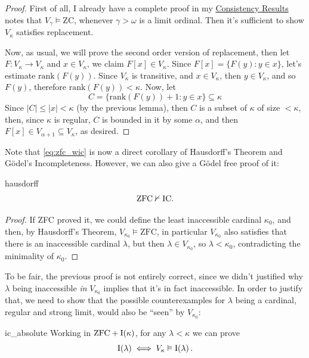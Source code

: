 \begin{proof}
    First of all, I already have a complete proof in my \href{https://github.com/Xennonio/Consistency-Results}{Consistency Results} notes that $V_\gamma\vDash\text{ZC}$, whenever $\gamma>\omega$ is a limit ordinal. Then it's sufficient to show $V_\kappa$ satisfies replacement.

    Now, as usual, we will prove the second order version of replacement, then let $F:V_\kappa\to V_\kappa$ and $x\in V_\kappa$, we claim $F[x]\in V_\kappa$. Since $F[x]=\{F(y):y\in x\}$, let's estimate $\text{rank}(F(y))$. Since $V_\kappa$ is transitive, and $x\in V_\kappa$, then $y\in V_\kappa$, and so $F(y)$, therefore $\text{rank}(F(y))<\kappa$. Now, let
    $$C=\{\text{rank}(F(y))+1:y\in x\}\subseteq\kappa$$
    Since $\lvert C\rvert\leq\lvert x\rvert<\kappa$ (by the previous lemma), then $C$ is a subset of $\kappa$ of size $<\kappa$, then, since $\kappa$ is regular, $C$ is bounded in it by some $\alpha$, and then $F[x]\in V_{\alpha+1}\subseteq V_\kappa$, as desired.
\end{proof}

Note that \ref{eq:zfc_wic} is now a direct corollary of Hausdorff's Theorem and Gödel's Incompleteness. However, we can also give a Gödel free proof of it:

\begin{corollary}{}{hausdorff}
    $$\mathrm{ZFC}\nvdash\mathrm{IC}.$$
\end{corollary}

\begin{proof}
    If ZFC proved it, we could define the least inaccessible cardinal $\kappa_0$, and then, by Hausdorff's Theorem, $V_{\kappa_0}\vDash\text{ZFC}$, in particular $V_{\kappa_0}$ also satisfies that there is an inaccessible cardinal $\lambda$, but then $\lambda\in V_{\kappa_0}$, so $\lambda<\kappa_0$, contradicting the minimality of $\kappa_0$.
\end{proof}

To be fair, the previous proof is not entirely correct, since we didn't justified why $\lambda$ being inaccessible \textit{in} $V_{\kappa_0}$ implies that it's in fact inaccessible. In order to justify that, we need to show that the possible counterexamples for $\lambda$ being a cardinal, regular and strong limit, would also be ``seen'' by $V_{\kappa_0}$:

\begin{lemma}{}{ic_absolute}
    Working in $\mathrm{ZFC}+\mathrm{I}\!\left(\kappa\right)$, for any $\lambda<\kappa$ we can prove
    $$\mathrm{I}\!\left(\lambda\right)\iff V_\kappa\vDash\mathrm{I}\!\left(\lambda\right).$$
\end{lemma}

